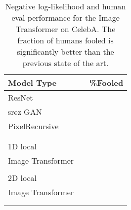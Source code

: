 \documentclass{article}
\begin{document}
\begin{table}[h!]
\caption{Negative log-likelihood and human eval performance for the Image Transformer on CelebA. The fraction of humans fooled is significantly better than the previous state of the art.}
\label{tab:superres_table}
\begin{center}
\vspace{2mm}
\begin{tabular}{lll}
Model Type  &  & \%Fooled  \\
\hline
ResNet  &  &   \\
srez GAN  &  &   \\
\hline
PixelRecursive &   &   \\
\citep{PixelRecursiveSuperResolution} &   &   \\
&   &  \\
\hline
1D local &   &  \\
Image Transformer &  &  \\
&  &   \\
\hline
2D local &  &  \\
Image Transformer&  &   \\
&  &   \\
\bottomrule
\label{tab:CelebASuperResolution}
\end{tabular}

\end{center}
\end{table}









%
 
\end{document}
